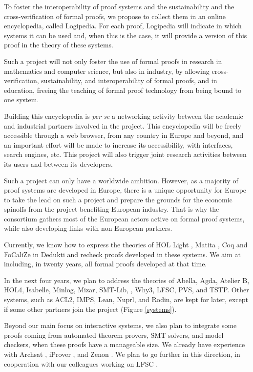 To foster the interoperability of proof systems and the sustainability
and the cross-verification of formal proofs, we propose to collect
them in an online encyclopedia, called {\sc Logipedia}.  For each
proof, {\sc Logipedia} will indicate in which systems it can be used
and, when this is the case, it will provide a version of this proof in
the theory of these systems.

Such a project will not only foster the use of formal proofs in
research in mathematics and computer science, but also in industry, by
allowing cross-verification, sustainability, and interoperability of
formal proofs, and in education, freeing the teaching of formal proof
technology from being bound to one system.

Building this encyclopedia is {\em per se} a networking activity
between the academic and industrial partners involved in the project.
This encyclopedia will be freely accessible through a web browser,
from any country in Europe and beyond, and an important effort will be
made to increase its accessibility, with interfaces, search engines,
etc.  This project will also trigger joint research activities between
its users and between its developers.

Such a project can only have a worldwide ambition. However, as a
majority of proof systems are developed in Europe, there is a unique
opportunity for Europe to take the lead on such a project and prepare
the grounds for the economic spinoffs from the project benefiting
European industry. That is why the consortium gathers most of the
European actors active on formal proof systems, while also developing
links with non-European partners.

Currently, we know how to express the theories of {\sc HOL Light}
\cite{Assaf12}, {\sc Matita} \cite{Assaf15}, {\sc Coq} and {\sc FoCaliZe}
\cite{Cauderlier16} in {\sc
  Dedukti} and recheck proofs developed in these systems.  We aim at
including, in twenty years, all formal proofs developed at that time.

In the next four years, we plan to address the theories of {\sc
  Abella}, {\sc Agda}, {\sc Atelier B}, {\sc HOL4}, {\sc Isabelle},
{\sc Minlog}, {\sc Mizar}, {\sc SMT-Lib}, \tlaplus, {\sc Why3}, {\sc
  LFSC}, {\sc PVS}, and {\sc TSTP}.  Other systems, such as {\sc
  ACL2}, {\sc IMPS}, {\sc Lean}, {\sc Nuprl}, and {\sc Rodin}, are
kept for later, except if some other partners join the project (Figure
\ref{systems}).

Beyond our main focus on interactive systems, we also plan to
integrate some proofs coming from automated theorem provers, SMT
solvers, and model checkers, when these proofs have a manageable
size. We already have experience with Archsat \cite{Bury19}, iProver
\cite{Burel10}, and Zenon \cite{CauderlierHalmagrand15}. We plan to go
further in this direction, in cooperation with our colleagues working
on LFSC \cite{Stump09}.

